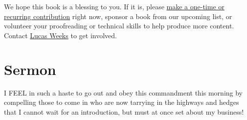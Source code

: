 \documentclass[
]{book}
\begin{document}
We hope this book is a blessing to you. If it is, please \href{https://warhornmedia.com/give}{make a one-time or recurring contribution} right now, sponsor a book from our upcoming list, or volunteer your proofreading or technical skills to help produce more content. Contact \href{mailto:lucas@beggarsborn.com}{Lucas Weeks} to get involved.

\clearpage
\setcounter{page}{1}

\hypertarget{sermon}{%
\chapter{Sermon}\label{sermon}}

I FEEL in such a haste to go out and obey this commandment this morning by compelling those to come in who are now tarrying in the highways and hedges that I cannot wait for an introduction, but must at once set about my business!
\end{document}
